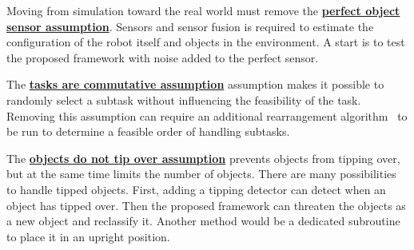 Moving from simulation toward the real world must remove the \hyperref[assumption:perfect_object_sensor]{\textbf{perfect object sensor assumption}}. Sensors and sensor fusion is required to estimate the configuration of the robot itself and objects in the environment. A start is to test the proposed framework with noise added to the perfect sensor.\bs

The \hyperref[assumption:order_does_not_matter]{\textbf{tasks are commutative assumption}} assumption makes it possible to randomly select a subtask without influencing the feasibility of the task. Removing this assumption can require an additional rearrangement algorithm~\cite{krontiris_dealing_2015} to be run to determine a feasible order of handling subtasks.\bs

The \hyperref[assumption:no_tipping]{\textbf{objects do not tip over assumption}} prevents objects from tipping over, but at the same time limits the number of objects. There are many possibilities to handle tipped objects. First, adding a tipping detector can detect when an object has tipped over. Then the proposed framework can threaten the objects as a new object and reclassify it. Another method would be a dedicated subroutine to place it in an upright position.\bs

%
